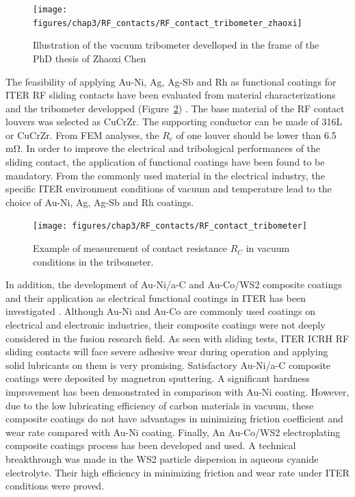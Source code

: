 {\begin{figure}[h]
	\centering
	\texttt{[image: figures/chap3/RF\_contacts/RF\_contact\_tribometer\_zhaoxi]}
	\caption{Illustration of the vacuum tribometer develloped in the frame of the PhD thesis of Zhaoxi Chen\cite{chen2018}}
	\label{fig:rfcontacttribometerzhaoxi}
\end{figure}

The feasibility of applying Au-Ni, Ag, Ag-Sb and Rh as functional coatings for ITER RF sliding contacts have been evaluated from material characterizations and the tribometer developped (Figure~\ref{fig:rfcontacttribometerresults}) . The base material of the RF contact louvers was selected as CuCrZr. The supporting conductor can be made of 316L or CuCrZr. From FEM analyses, the $R_c$ of one louver should be lower than 6.5~$\si{\milli\ohm}$. In order to improve the electrical and tribological performances of the sliding contact, the application of functional coatings have been found to be mandatory. From the commonly used material in the electrical industry, the specific ITER environment conditions of vacuum and temperature lead to the choice of Au-Ni, Ag, Ag-Sb and Rh coatings. 

\begin{figure}[h]
	\centering
	\texttt{[image: figures/chap3/RF\_contacts/RF\_contact\_tribometer]}
	\caption{Example of measurement of contact resistance $R_C$ in vacuum conditions in the tribometer. }
	\label{fig:rfcontacttribometerresults}
\end{figure}

In addition, the development of Au-Ni/a-C and Au-Co/WS2 composite coatings and their application as electrical functional coatings in ITER has been investigated . Although Au-Ni and Au-Co are commonly used coatings on electrical and electronic industries, their composite coatings were not deeply considered in the fusion research field. As seen with sliding tests, ITER ICRH RF sliding contacts will face severe adhesive wear during operation and applying solid lubricants on them is very promising. Satisfactory Au-Ni/a-C composite coatings were deposited by magnetron sputtering. A significant hardness improvement has been demonstrated in comparison with Au-Ni coating. However, due to the low lubricating efficiency of carbon materials in vacuum, these composite coatings do not have advantages in minimizing friction coefficient and wear rate compared with Au-Ni coating. Finally, An Au-Co/WS2 electroplating composite coatings process has been developed and used. A technical breakthrough was made in the WS2 particle dispersion in aqueous cyanide electrolyte\cite{chen2020}. Their high efficiency in minimizing friction and wear rate under ITER conditions were proved. 

}
